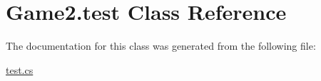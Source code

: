 \hypertarget{class_game2_1_1test}{}\section{Game2.\+test Class Reference}
\label{class_game2_1_1test}


The documentation for this class was generated from the following file\+:\begin{DoxyCompactItemize}
\item 
\mbox{\hyperlink{test_8cs}{test.\+cs}}\end{DoxyCompactItemize}
